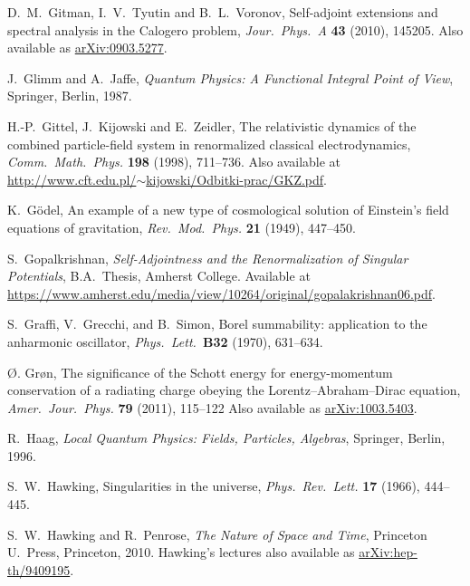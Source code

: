 \documentclass[12pt]{article}
\begin{document}
\begin{thebibliography}{10}
 D.\ M.\ Gitman, I.\ V.\ Tyutin and B.\ L.\ Voronov, Self-adjoint extensions and spectral analysis in the Calogero problem,  \textsl{Jour.\ Phys.\ A} \textbf{43} (2010), 145205. Also available as \href{http://arxiv.org/abs/0903.5277}{arXiv:0903.5277}.

 J.\ Glimm and A.\ Jaffe, \textsl{Quantum Physics: A Functional Integral Point of View}, Springer, Berlin, 1987. 

 H.-P.\ Gittel, J.\ Kijowski and E.\ Zeidler, The relativistic 
dynamics of the combined particle-field system in renormalized classical 
electrodynamics, \textsl{Comm.\ Math.\ Phys.} \textbf{198} (1998), 711--736.
Also available at \href{http://www.cft.edu.pl/~kijowski/Odbitki-prac/GKZ.pdf}{http://www.cft.edu.pl/$\sim$kijowski/Odbitki-prac/GKZ.pdf}.

 K.\ G\"odel, An example of a new type of cosmological solution of Einstein's field equations of gravitation, \textsl{Rev.\ Mod.\ Phys.} \textbf{21} (1949), 447--450. 

 S.\ Gopalkrishnan, \textsl{Self-Adjointness and the Renormalization of Singular Potentials}, B.A.\ Thesis, Amherst College.  Available at \href{https://www.amherst.edu/media/view/10264/original/gopalakrishnan06.pdf}{https://www.amherst.edu/media/view/10264/original/gopalakrishnan06.pdf}.

 S.\ Graffi, V.\ Grecchi, and B.\ Simon, Borel summability: application to the anharmonic oscillator, \textsl{Phys.\ Lett.\ }\textbf{B32} (1970), 631--634.

 \O. Gr\o n, The significance of the Schott energy for energy-momentum conservation of a radiating charge obeying the Lorentz--Abraham--Dirac equation, \textsl{Amer.\ Jour.\ Phys.} \textbf{79} (2011), 115--122  Also available as \href{http://arxiv.org/abs/1003.5403}{arXiv:1003.5403}.

 R.\ Haag, \textsl{Local Quantum Physics: Fields, Particles, Algebras}, Springer, Berlin, 1996.

 S.\ W.\ Hawking, Singularities in the universe, \textsl{Phys.\ Rev.\ Lett.} \textbf{17} (1966), 444--445.

 S.\ W.\ Hawking and R.\ Penrose, \textsl{The Nature
of Space and Time}, Princeton U.\ Press, Princeton, 2010.   Hawking's lectures also available as \href{http://arxiv.org/abs/hep-th/9409195}{arXiv:hep-th/9409195}.


\end{thebibliography}
\end{document}

